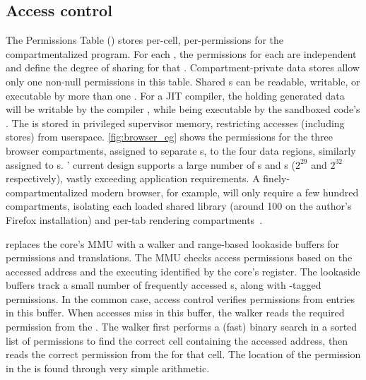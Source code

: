\subsection{Access control}
\label{sec:design:access_ctl}
The Permissions Table (\ptable) stores 
per-cell, per-\secdiv permissions for the compartmentalized 
program.
For each \cell, the permissions for each \secdiv are independent
and define the degree of sharing for that \cell.
Compartment-private data stores allow only one \secdiv non-null 
permissions in this table.
Shared \cell{}s can be readable, writable, or executable by more than one
\secdiv.
For a JIT compiler, the \cell holding generated data will be writable
by the compiler \secdiv, while being executable by the sandboxed code's
\secdiv.
The \ptable is stored in privileged supervisor memory, restricting
accesses (including stores) from userspace.
\autoref{fig:browser_eg} shows the permissions for the three browser 
compartments, assigned to separate \secdiv{}s, to the four 
data regions, similarly assigned to \cell{}s.
\seccells' current \ptable design supports a large number of 
\secdiv{}s and \cell{}s ($2^{29}$ and $2^{32}$ respectively), 
vastly exceeding application requirements.
A finely-compartmentalized modern browser, for example, will only require
a few hundred compartments, isolating each loaded shared 
library (around 100 on the author's Firefox installation)
and per-tab rendering compartments~\cite{barth2008security}.

\seccells replaces the core's MMU with a \ptable walker and 
range-based lookaside buffers for permissions and translations.
The MMU checks access permissions based on the accessed address and
the executing \secdiv identified by the core's \sid register.
The lookaside buffers track a small number of frequently accessed
\cell{}s, along with \sid-tagged permissions.
In the common case, access control verifies permissions from
entries in this buffer.
When accesses miss in this buffer, the \ptable walker reads the
required permission from the \ptable.
The walker first performs a (fast) binary search in a sorted list of permissions
to find the correct cell containing the accessed address, then
reads the correct permission from the \ptable for that cell.
The location of the permission in the \ptable is found through very 
simple arithmetic.

